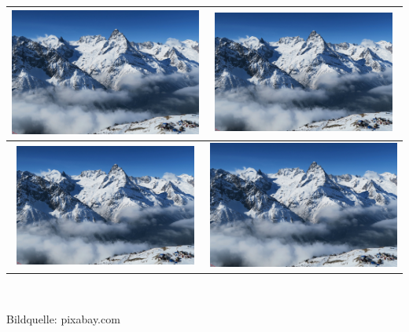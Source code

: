 \documentclass[12pt,fleqn] {article}
\author{Daniel Krall (11742259)}
\date{10.01.2020}
\title{\vspace{-3cm}}
\begin{document}
	\maketitle
	\thispagestyle{empty} %
	{\centering
		\hspace*{-1.5cm}\begin{tabular}{|c|c|} \hline
			\includegraphics[width=8cm]{snow-covered-1246246_1920} & 
			\includegraphics[width=6cm,angle=45]{snow-covered-1246246_1920}
			\\ \hline
			\includegraphics[width=6cm,angle=270]{snow-covered-1246246_1920} & \includegraphics[width=8cm,angle=180]{snow-covered-1246246_1920}
			\\ \hline
		\end{tabular}
	}
	\\
	\begin{center}
		Bildquelle: pixabay.com
	\end{center}
\end{document}
